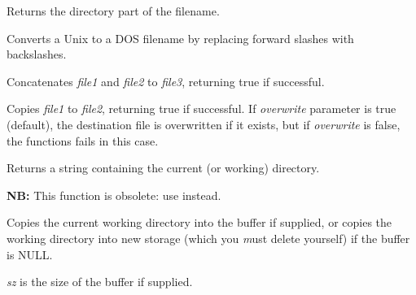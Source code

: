 \label{wxpathonly}


Returns the directory part of the filename.


\label{wxunix2dosfilename}


Converts a Unix to a DOS filename by replacing forward
slashes with backslashes.


\label{wxconcatfiles}


Concatenates {\it file1} and {\it file2} to {\it file3}, returning
true if successful.


\label{wxcopyfile}


Copies {\it file1} to {\it file2}, returning true if successful. If
{\it overwrite} parameter is true (default), the destination file is overwritten
if it exists, but if {\it overwrite} is false, the functions fails in this
case.


\label{wxgetcwd}


Returns a string containing the current (or working) directory.


\label{wxgetworkingdirectory}


{\bf NB:} This function is obsolete: use  instead.

Copies the current working directory into the buffer if supplied, or
copies the working directory into new storage (which you {\emph must} delete
yourself) if the buffer is NULL.

{\it sz} is the size of the buffer if supplied.


\label{wxgettempfilename}


